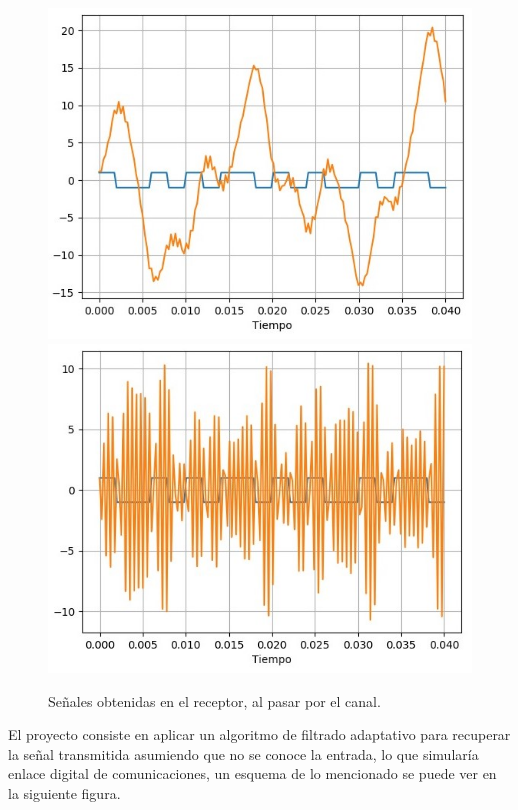 \documentclass[main.tex]{subfiles}
\begin{document}
\begin{figure}[H]
    \centering
    \includegraphics[scale=0.5]{imagenes/3.jpeg}\\
    \includegraphics[scale=0.5]{imagenes/4.jpeg}
    \caption{Señales obtenidas en el receptor, al pasar por el canal.}
\end{figure}

El proyecto consiste en aplicar un algoritmo de filtrado adaptativo
 para recuperar la señal transmitida asumiendo que no se conoce la entrada, 
 lo que simularía enlace digital de comunicaciones, un esquema de lo mencionado
se puede ver en la siguiente figura.
\end{document}
